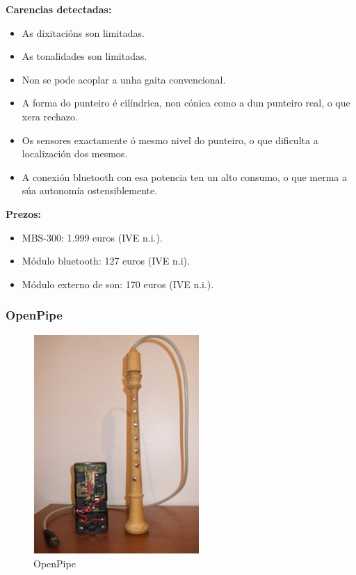   \textbf{Carencias detectadas:}

  \begin{itemize}
   \item As dixitacións son limitadas.
   \item As tonalidades son limitadas.
   \item Non se pode acoplar a unha gaita convencional.
   \item A forma do punteiro é cilíndrica, non cónica como a dun punteiro real,
         o que xera rechazo.
   \item Os sensores exactamente ó mesmo nivel do punteiro, o que dificulta a
         localización dos mesmos.
   \item A conexión bluetooth con esa potencia ten un alto consumo, o que
         merma a súa autonomía ostensiblemente.
  \end{itemize}

  \textbf{Prezos:}

  \begin{itemize}
   \item MBS-300: 1.999 euros (IVE n.i.).
   \item Módulo bluetooth: 127 euros (IVE n.i).
   \item Módulo externo de son: 170 euros (IVE n.i.).
  \end{itemize}

  \subsubsection{OpenPipe}
 
  \begin{figure}[htbp]
   \centering
   \includegraphics[scale=0.7,keepaspectratio=true]{./imagenes/openpipe.png}
   \caption[OpenPipe]{OpenPipe \cite{OpenPipe}}
   \label{figura:OpenPipe}
  \end{figure}

